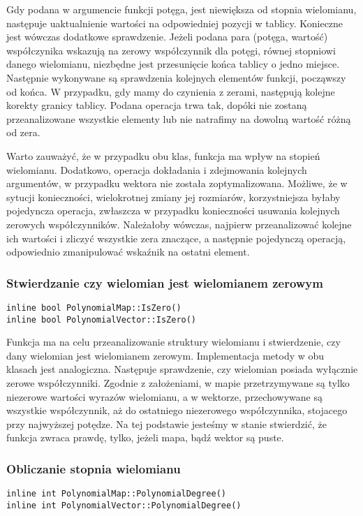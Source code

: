 \documentclass[twoside,a4paper]{book}
\begin{document}
Gdy podana w argumencie funkcji potęga, jest niewiększa od stopnia wielomianu, następuje uaktualnienie wartości na odpowiedniej pozycji w tablicy. Konieczne jest wówczas dodatkowe sprawdzenie. Jeżeli podana para (potęga, wartość) współczynika wskazują na zerowy współczynnik dla potęgi, równej stopniowi danego wielomianu, niezbędne jest przesunięcie końca tablicy o jedno miejsce. Następnie wykonywane są sprawdzenia kolejnych elementów funkcji, począwszy od końca. W przypadku, gdy mamy do czynienia z zerami, następują kolejne korekty granicy tablicy. Podana operacja trwa tak, dopóki nie zostaną przeanalizowane wszystkie elementy lub nie natrafimy na dowolną wartość różną od zera.

Warto zauważyć, że w przypadku obu klas, funkcja ma wpływ na stopień wielomianu. Dodatkowo, operacja dokładania i zdejmowania kolejnych argumentów, w przypadku wektora nie została zoptymalizowana. Możliwe, że w sytucji konieczności, wielokrotnej zmiany jej rozmiarów, korzystniejsza byłaby pojedyncza operacja, zwłaszcza w przypadku konieczności usuwania kolejnych zerowych współczynników. Należałoby wówczas, najpierw przeanalizować kolejne ich wartości i zliczyć wszystkie zera znaczące, a następnie pojedynczą operacją, odpowiednio zmanipulować wskaźnik na ostatni element.
\\

\subsubsection{Stwierdzanie czy wielomian jest wielomianem zerowym}
\begin{lstlisting}
inline bool PolynomialMap::IsZero()
inline bool PolynomialVector::IsZero()
\end{lstlisting}

Funkcja ma na celu przeanalizowanie struktury wielomianu i stwierdzenie, czy dany wielomian jest wielomianem zerowym. Implementacja metody w obu klasach jest analogiczna. Następuje sprawdzenie, czy wielomian posiada wyłącznie zerowe współczynniki. Zgodnie z założeniami, w mapie przetrzymywane są tylko niezerowe wartości wyrazów wielomianu, a w wektorze, przechowywane są wszystkie współczynnik, aż do ostatniego niezerowego współczynnika, stojacego przy najwyższej potędze. Na tej podstawie jesteśmy w stanie stwierdzić, że funkcja zwraca prawdę, tylko, jeżeli mapa, bądź wektor są puste.
\\

\subsubsection{Obliczanie stopnia wielomianu}
\begin{lstlisting}
inline int PolynomialMap::PolynomialDegree()
inline int PolynomialVector::PolynomialDegree()
\end{lstlisting}
\end{document}
